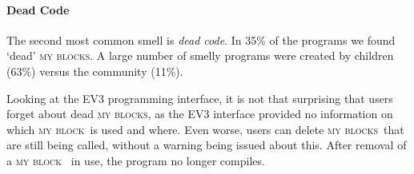\documentclass[conference]{IEEEtran}
\newcommand{\mbs}{\textsc{my blocks}}
\newcommand{\mb}{\textsc{my block}}
\begin{document}
%

\paragraph{Dead Code}
The second most common smell is \emph{dead code}. In 35\% of the programs we found `dead' \mbs. A large number of smelly programs were created by children (63\%) versus the community (11\%). 

Looking at the EV3 programming interface, it is not that surprising that users forget about dead \mbs, as the EV3 interface provided no information on which \mb~is used and where. Even worse, users can delete \mbs~that are still being called, without a warning being issued about this. After removal of a \mb~ in use, the program no longer compiles.

\end{document}
